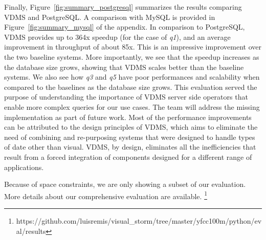 Finally, Figure~\ref{fig:summary_postgresql} summarizes the results
comparing VDMS and PostgreSQL. A comparison with MySQL is
provided in Figure~\ref{fig:summary_mysql} of the appendix.
In comparison to PostgreSQL, VDMS provides up to 364x speedup
(for the case of \textit{q1}),
and an average improvement in throughput of about 85x. This is
an impressive improvement over the two baseline systems.
More importantly, we see that the speedup increases as the database size grows,
showing that VDMS scales better than the baseline systems.
We also see how \textit{q3} and \textit{q5} have poor performances and scalability
when compared to the baselines as the database size grows.
This evaluation served the
purpose of understanding the importance of VDMS server side operators
that enable more complex queries for our use cases.
The team will address the missing implementation as part of future work.
Most of the performance improvements can be attributed to the design
principles of VDMS, which aims to eliminate the need of combining and
re-purposing systems that were designed to handle types of date other than visual.
VDMS, by design, eliminates all the inefficiencies that result
from a forced integration of components designed for a
different range of applications.

Because of space constraints, we are only showing a subset of our evaluation.
More details about our comprehensive evaluation are available.
\footnote{https://github.com/luisremis/visual\_storm/tree/master/yfcc100m/python/eval/results}

